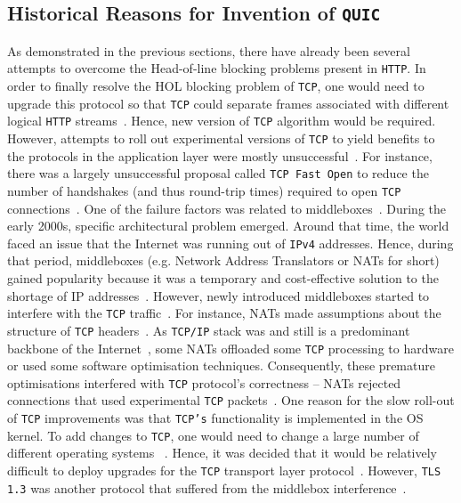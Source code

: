 \documentclass[12pt,a4paper,twoside,openright]{report}
\begin{document}
\subsection{Historical Reasons for Invention of \texttt{QUIC}}
As demonstrated in the previous sections, there have already been several attempts to overcome the Head-of-line blocking problems present in \texttt{HTTP}.
In order to finally resolve the HOL blocking problem of \texttt{TCP}, one would need to upgrade this protocol so that \texttt{TCP} could separate frames associated with different logical \texttt{HTTP} streams~\cite{head-of-line-blocking-in-quic-and-http-3-the-details}.
Hence, new version of \texttt{TCP} algorithm would be required. 
However, attempts to roll out experimental versions of \texttt{TCP} to yield benefits to the protocols in the application layer were mostly unsuccessful~\cite{bib_Netdev_0x13_QUIC_Tutorial, PollardBarry2019HiAP}.
For instance, there was a largely unsuccessful proposal called \texttt{TCP Fast Open} to reduce the number of handshakes (and thus round-trip times) required to open \texttt{TCP} connections~\cite{the-sad-story-of-tcp-fast-open}.
One of the failure factors was related to middleboxes~\cite{the-sad-story-of-tcp-fast-open}.
During the early 2000s, specific architectural problem emerged.
Around that time, the world faced an issue that the Internet was running out of \texttt{IPv4} addresses.
Hence, during that period, middleboxes (e.g. Network Address Translators or NATs for short) gained popularity because it was a temporary and cost-effective solution to the shortage of IP addresses~\cite{MurphyNiallRichard2005Ina, bib_Netdev_0x13_QUIC_Tutorial}.
However, newly introduced middleboxes started to interfere with the \texttt{TCP} traffic~\cite{bib_Netdev_0x13_QUIC_Tutorial, PollardBarry2019HiAP}.
For instance, NATs made assumptions about the structure of \texttt{TCP} headers~\cite{bib_Netdev_0x13_QUIC_Tutorial, PollardBarry2019HiAP}.
As \texttt{TCP/IP} stack was and still is a predominant backbone of the Internet~\cite{tcp-ip-stack_shtml}, some NATs offloaded some \texttt{TCP} processing to hardware or used some software optimisation techniques.
Consequently, these premature optimisations interfered with \texttt{TCP} protocol's correctness -- NATs rejected connections that used experimental \texttt{TCP} packets~\cite{PollardBarry2019HiAP}.
One reason for the slow roll-out of \texttt{TCP} improvements was that \texttt{TCP's} functionality is implemented in the OS kernel.
To add changes to \texttt{TCP}, one would need to change a large number of different operating systems ~\cite{PollardBarry2019HiAP}.
Hence, it was decided that it would be relatively difficult to deploy upgrades for the \texttt{TCP} transport layer protocol~\cite{head-of-line-blocking-in-quic-and-http-3-the-details}.
However, \texttt{TLS 1.3} was another protocol that suffered from the middlebox interference~\cite{why-tls-1-3-isnt-in-browsers-yet}.
\end{document}
